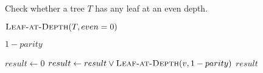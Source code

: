 
\begin{algorithm}[H]
  \caption{Check whether a tree $T$ has any leaf at an even depth.}
  \label{alg:leaf-at-even-depth}
  \begin{algorithmic}[1]
      \State \Return $\Call{Leaf-at-Depth}{T, even = 0}$
    \EndProcedure

    \Statex
     
        \State \Return $1-parity$
      \EndIf

      \Statex
      \State $result \gets 0$
	\State $result \gets result \lor \Call{Leaf-at-Depth}{v, 1-parity}$
      \EndFor
      \State \Return $result$
    \EndProcedure
  \end{algorithmic}
\end{algorithm}

